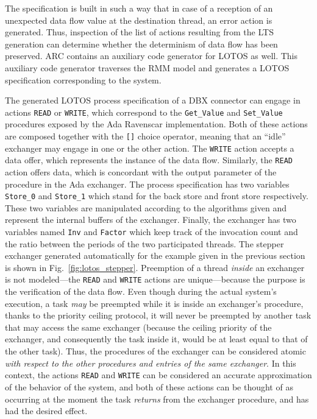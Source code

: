 The specification is built in such a way that in case of a reception
of an unexpected data flow value at the destination thread, an error
action is generated. Thus, inspection of the list of actions resulting
from the LTS generation can determine whether the determinism of data
flow has been preserved. ARC contains an auxiliary code generator for
LOTOS as well. This auxiliary code generator traverses the RMM model
and generates a LOTOS specification corresponding to the system.

The generated LOTOS process specification of a DBX connector can
engage in actions \texttt{READ} or \texttt{WRITE}, which correspond to
the \texttt{Get\_Value} and \texttt{Set\_Value} procedures exposed by
the Ada Ravenscar implementation. Both of these actions are composed
together with the \texttt{[]} choice operator, meaning that an
``idle'' exchanger may engage in one or the other action. The
\texttt{WRITE} action accepts a data offer, which represents the
instance of the data flow. Similarly, the \texttt{READ} action offers
data, which is concordant with the output parameter of the procedure
in the Ada exchanger. The process specification has two variables
\texttt{Store\_0} and \texttt{Store\_1} which stand for the back store
and front store respectively. These two variables are manipulated
according to the algorithms given and represent the internal buffers
of the exchanger. Finally, the exchanger has two variables named
\texttt{Inv} and \texttt{Factor} which keep track of the invocation
count and the ratio between the periods of the two participated
threads. The stepper exchanger generated automatically for the example
given in the previous section is shown in
Fig.~\ref{fig:lotos_stepper}. Preemption of a thread \emph{inside} an
exchanger is not modeled---the \texttt{READ} and \texttt{WRITE}
actions are unique---because the purpose is the verification of the
data flow. Even though during the actual system's execution, a task
\emph{may} be preempted while it is inside an exchanger's procedure,
thanks to the priority ceiling protocol, it will never be preempted by
another task that may access the same exchanger (because the ceiling
priority of the exchanger, and consequently the task inside it, would
be at least equal to that of the other task). Thus, the procedures of
the exchanger can be considered atomic \emph{with respect to the other
  procedures and entries of the same exchanger}. In this context, the
actions \texttt{READ} and \texttt{WRITE} can be considered an accurate
approximation of the behavior of the system, and both of these actions
can be thought of as occurring at the moment the task \emph{returns}
from the exchanger procedure, and has had the desired effect.

